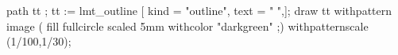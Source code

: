\setupMPvariables[ShadowedText][shadowedtext={\bfb text} ]
   path tt ; tt := lmt_outline [
        kind = "outline",
        text = " ",];
   draw tt withpattern image (
        fill fullcircle scaled 5mm withcolor "darkgreen" ;)
   withpatternscale (1/100,1/30);
\stopuniqueMPgraphic
{}
%
%

%
%
%
%
%
%
%


